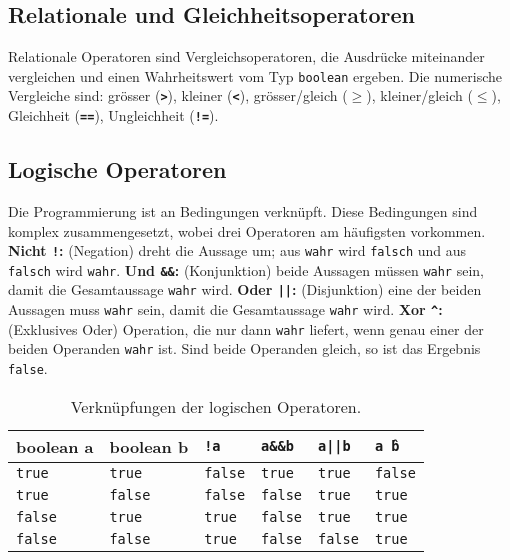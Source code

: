 \subsection{Relationale und Gleichheitsoperatoren}
Relationale Operatoren sind Vergleichsoperatoren, die Ausdrücke miteinander vergleichen und einen Wahrheitswert vom Typ \texttt{boolean} ergeben. Die numerische Vergleiche sind: grösser (\textbf{\texttt{>}}), kleiner (\textbf{\texttt{<}}), grösser/gleich (\textbf{\texttt{$\geq$}}), kleiner/gleich (\textbf{\texttt{$\leq$}}), Gleichheit (\textbf{\texttt{==}}), Ungleichheit (\textbf{\texttt{!=}}).
\subsection{Logische Operatoren}
Die Programmierung ist an Bedingungen verknüpft. Diese Bedingungen sind komplex zusammengesetzt, wobei drei Operatoren am häufigsten vorkommen. \textbf{Nicht \texttt{!}:} (Negation) dreht die Aussage um; aus \texttt{wahr} wird \texttt{falsch} und aus \texttt{falsch} wird \texttt{wahr}. \textbf{Und \texttt{\&\&}:} (Konjunktion) beide Aussagen müssen \texttt{wahr} sein, damit die Gesamtaussage \texttt{wahr} wird. \textbf{Oder \texttt{||}:} (Disjunktion) eine der beiden Aussagen muss \texttt{wahr} sein, damit die Gesamtaussage \texttt{wahr} wird. \textbf{Xor \texttt{\^}:} (Exklusives Oder) Operation, die nur dann \texttt{wahr} liefert, wenn genau einer der beiden Operanden \texttt{wahr} ist. Sind beide Operanden gleich, so ist das Ergebnis \texttt{false}.
\begin{table}[H]
\centering
\begin{tabular}{llllll}
\hline
boolean a& boolean b&\texttt{!a}&\texttt{a\&\&b}&\texttt{a||b}&\texttt{a\^\,b}\\\hline
\texttt{true}&\texttt{true}&\texttt{false}&\texttt{true}&\texttt{true}&\texttt{false}\\
\texttt{true}&\texttt{false}&\texttt{false}&\texttt{false}&\texttt{true}&\texttt{true}\\
\texttt{false}&\texttt{true}&\texttt{true}&\texttt{false}&\texttt{true}&\texttt{true}\\
\texttt{false}&\texttt{false}&\texttt{true}&\texttt{false}&\texttt{false}&\texttt{true}\\\hline
\end{tabular}
\caption{Verknüpfungen der logischen Operatoren.}
\end{table}
